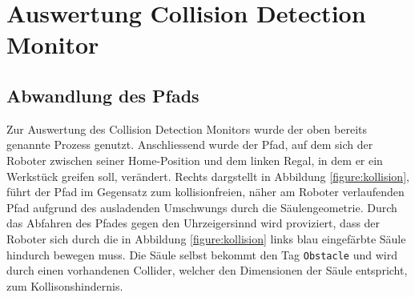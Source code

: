 \section{Auswertung Collision Detection Monitor}
\label{sec:collisionauswertung}

\subsection{Abwandlung des Pfads} Zur Auswertung des Collision Detection
Monitors wurde der oben bereits genannte Prozess genutzt. Anschliessend wurde
der Pfad, auf dem sich der Roboter zwischen seiner Home-Position und dem linken
Regal, in dem er ein Werkstück greifen soll, verändert. Rechts dargstellt in
Abbildung \ref{figure:kollision}, führt der Pfad im Gegensatz zum
kollisionfreien, näher am Roboter verlaufenden Pfad aufgrund des ausladenden
Umschwungs durch die Säulengeometrie. Durch das Abfahren des Pfades gegen den
Uhrzeigersinnd wird proviziert, dass der Roboter sich durch die in Abbildung
\ref{figure:kollision} links blau eingefärbte Säule hindurch bewegen
muss. Die Säule selbst
bekommt den Tag \texttt{Obstacle} und wird durch einen vorhandenen Collider,
welcher den Dimensionen der Säule entspricht, zum Kollisonshindernis.

